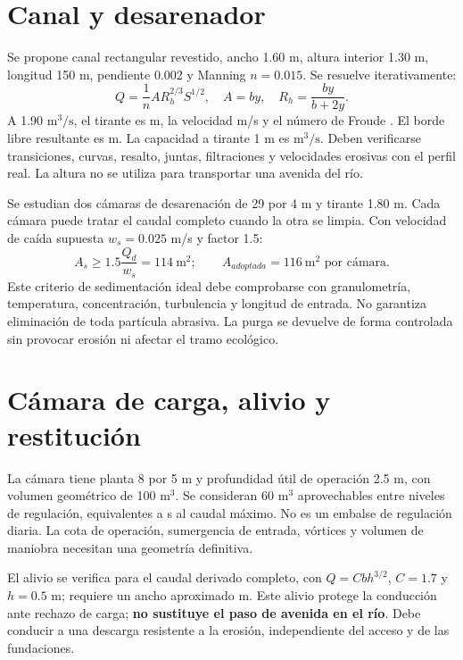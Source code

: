 \section{Canal y desarenador}
Se propone canal rectangular revestido, ancho 1.60 m, altura interior 1.30 m, longitud 150 m, pendiente 0.002 y Manning \(n=0.015\). Se resuelve iterativamente:
\begin{equation}Q=\frac{1}{n}A R_h^{2/3}S^{1/2},\quad A=by,\quad R_h=\frac{by}{b+2y}.\end{equation}
A 1.90 \(\mathrm{m^3/s}\), el tirante es  m, la velocidad  m/s y el número de Froude . El borde libre resultante es  m. La capacidad a tirante 1 m es  \(\mathrm{m^3/s}\). Deben verificarse transiciones, curvas, resalto, juntas, filtraciones y velocidades erosivas con el perfil real. La altura no se utiliza para transportar una avenida del río.

Se estudian dos cámaras de desarenación de 29 por 4 m y tirante 1.80 m. Cada cámara puede tratar el caudal completo cuando la otra se limpia. Con velocidad de caída supuesta \(w_s=0.025\) m/s y factor 1.5:
\begin{equation}A_s\geq1.5\frac{Q_d}{w_s}=114\ \mathrm{m^2};\qquad A_{adoptada}=116\ \mathrm{m^2}\text{ por cámara}.\end{equation}
Este criterio de sedimentación ideal debe comprobarse con granulometría, temperatura, concentración, turbulencia y longitud de entrada. No garantiza eliminación de toda partícula abrasiva. La purga se devuelve de forma controlada sin provocar erosión ni afectar el tramo ecológico.

\section{Cámara de carga, alivio y restitución}
La cámara tiene planta 8 por 5 m y profundidad útil de operación 2.5 m, con volumen geométrico de 100 \(\mathrm{m^3}\). Se consideran 60 \(\mathrm{m^3}\) aprovechables entre niveles de regulación, equivalentes a  s al caudal máximo. No es un embalse de regulación diaria. La cota de operación, sumergencia de entrada, vórtices y volumen de maniobra necesitan una geometría definitiva.

El alivio se verifica para el caudal derivado completo, con \(Q=C b h^{3/2}\), \(C=1.7\) y \(h=0.5\) m; requiere un ancho aproximado  m. Este alivio protege la conducción ante rechazo de carga; \textbf{no sustituye el paso de avenida en el río}. Debe conducir a una descarga resistente a la erosión, independiente del acceso y de las fundaciones.

